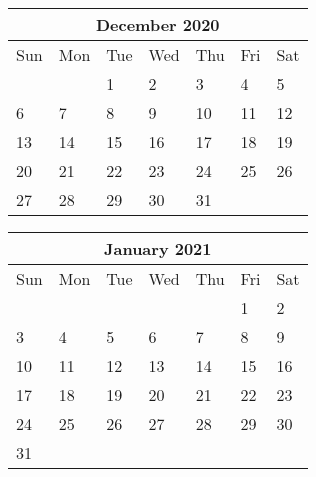 \documentclass{article}
\begin{document}
\begin{table}[t]
\centering
    
\renewcommand{\arraystretch}{1.5}
\begin{tabular}{|p{1.7cm}|p{1.7cm}|p{1.7cm}|p{1.7cm}|p{1.7cm}|p{1.7cm}|p{1.7cm}|} 
\hline
\multicolumn{7}{|c|}{December 2020}\\
\hline
Sun & Mon & Tue & Wed & Thu & Fri & Sat\\ 
\hline\hline
    
 & &{\large 1}&{\large 2}&{\large 3}&{\large 4}&{\large 5}\\ \hline 
{\large 6}&{\large 7}&{\large 8}&{\large 9}&{\large 10}&{\large 11}&{\large 12}\\ \hline 
{\large 13}&{\large 14}&{\large 15}&{\large 16}&{\large 17}&{\large 18}&{\large 19}\\ \hline 
{\large 20}&{\large 21}&{\large 22}&{\large 23}&{\large 24}&{\large 25}&{\large 26}\\ \hline 
{\large 27}&{\large 28}&{\large 29}&{\large 30}&{\large 31}& &\\ \hline 

\end{tabular}
\end{table} 
\begin{table}[t]
\centering
    
\renewcommand{\arraystretch}{1.5}
\begin{tabular}{|p{1.7cm}|p{1.7cm}|p{1.7cm}|p{1.7cm}|p{1.7cm}|p{1.7cm}|p{1.7cm}|} 
\hline
\multicolumn{7}{|c|}{January 2021}\\
\hline
Sun & Mon & Tue & Wed & Thu & Fri & Sat\\ 
\hline\hline
    
 & & & & &{\large 1}&{\large 2}\\ \hline 
{\large 3}&{\large 4}&{\large 5}&{\large 6}&{\large 7}&{\large 8}&{\large 9}\\ \hline 
{\large 10}&{\large 11}&{\large 12}&{\large 13}&{\large 14}&{\large 15}&{\large 16}\\ \hline 
{\large 17}&{\large 18}&{\large 19}&{\large 20}&{\large 21}&{\large 22}&{\large 23}\\ \hline 
{\large 24}&{\large 25}&{\large 26}&{\large 27}&{\large 28}&{\large 29}&{\large 30}\\ \hline 
{\large 31}& & & & & &\\ \hline 

\end{tabular}
\end{table} 
\end{document}
